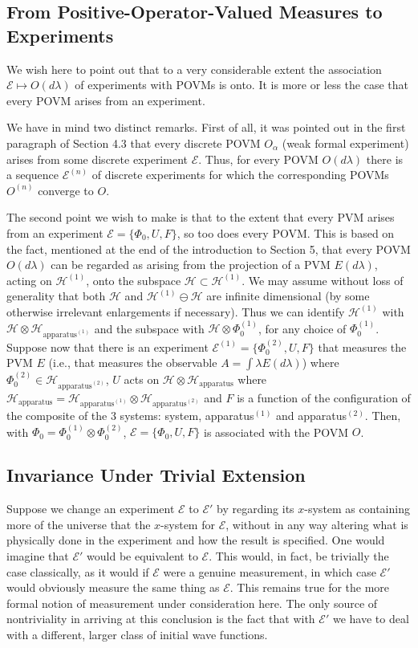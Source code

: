 \documentclass[12pt]{article}
\newcommand{\wf}{wave function}
\renewcommand{\a}{\alpha}
\newcommand{\lam}{\lambda}
\newcommand{\ot}{\otimes}
\renewcommand{\H}{\mbox{$\mathcal{H}$}}
\newcommand{\E}{\mbox{$\mathscr{E}$}}
\begin{document}
\subsection{From Positive-Operator-Valued Measures to
   Experiments}\label{subsec.fpovtoex} We wish here to point out that
to a very considerable extent the association $\E\mapsto O(d\lam)$ of
experiments with POVMs is onto. It is more or less the case that every
POVM arises {}from an experiment.

We have in mind two distinct remarks. First of all, it was pointed out
in the first paragraph of Section 4.3 that every discrete POVM $O_\a$
(weak formal experiment) arises {}from some discrete experiment \E{}.
Thus, for every POVM $O(d\lam)$ there is a sequence $\E^{(n)}$ of
discrete experiments for which the corresponding POVMs $O^{(n)}$
converge to $O$.

The second point we wish to make is that to the extent that every PVM
arises {}from an experiment $\E=\{\Phi_0,U, F\}$, so too does every
POVM.  This is based on the fact, mentioned at the end of the
introduction to Section 5, that every POVM $O(d\lam)$ can be regarded
as arising {}from the projection of a PVM $E(d\lam)$, acting on
$\H^{(1)}$, onto the subspace $\H\subset\H^{(1)}$. We may assume
without loss of generality that both $\H$ and $\H^{(1)}\ominus\H$ are
infinite dimensional (by some otherwise irrelevant enlargements if
necessary). Thus we can identify $\H^{(1)}$ with
$\H\ot\H_{\text{apparatus}^{(1)}}$ and the subspace with
$\H\ot\Phi_0^{(1)}$, for any choice of $\Phi_0^{(1)}$.  Suppose now
that there is an experiment $\E^{(1)}=\{\Phi_0^{(2)},U, F\}$ that
measures the PVM $E$ (i.e., that measures the observable $A=\int
\lam{} E(d\lam{})$) where $\Phi_0^{(2)}\in
\H_{\text{apparatus}^{(2)}}$, $U$ acts on $\H\ot\H_{\text{apparatus}}$
where $\H_{\text{apparatus}}= \H_{\text{apparatus}^{(1)}}\ot
\H_{\text{apparatus}^{(2)}}$ and $F$ is a function of the
configuration of the composite of the 3 systems: system,
apparatus$^{(1)}$ and apparatus$^{(2)}$.  Then, with $\Phi_0=
\Phi_0^{(1)}\ot \Phi_0^{(2)}$, $\E=\{\Phi_0,U, F\}$ is associated with
the POVM $O$.

\subsection{Invariance Under Trivial Extension}\label{subsec:iute}

Suppose we change an experiment $\E$ to $\E'$ by regarding its
$x$-system as containing more of the universe that the $x$-system for
$\E$, without in any way altering what is physically done in the
experiment and how the result is specified. One would imagine that
$\E'$ would be equivalent to $\E$. This would, in fact, be trivially
the case classically, as it would if $\E$ were a genuine measurement,
in which case $\E'$ would obviously measure the same thing as $\E$.
This remains true for the more formal notion of measurement under
consideration here.  The only source of nontriviality in arriving at
this conclusion is the fact that with $\E'$ we have to deal with a
different, larger class of initial \wf s.
\end{document}
